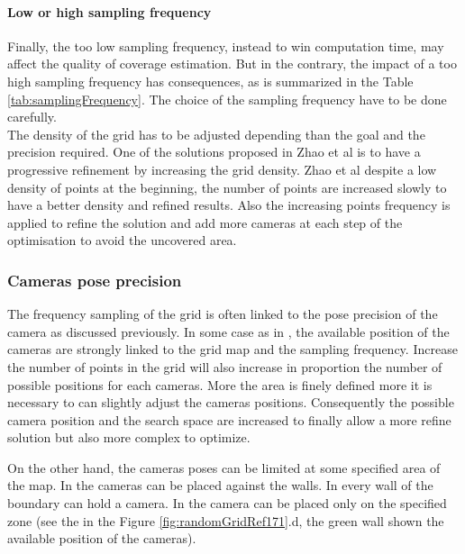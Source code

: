 \paragraph*{Low or high sampling frequency}
Finally, the too low sampling frequency, instead to win computation time, may affect the quality of coverage  estimation. But in the contrary, the impact of a too high sampling frequency has consequences, as is summarized in the Table \ref{tab:samplingFrequency}. The choice of the sampling frequency have to be done carefully. \\
The density of the grid has to be adjusted depending than the goal and the precision required. One of the solutions proposed in Zhao et al \citep{22*zhao2008} is to have a progressive refinement by increasing the grid density.
Zhao et al \citep{22*zhao2008} despite a low density of points at the beginning, the number of points are increased slowly to have a better density and refined results. Also the increasing points frequency is applied to refine the solution and add more cameras at each step of the optimisation to avoid the uncovered area.  \\


\subsubsection{Cameras pose precision}
The frequency sampling of the grid is often linked to the pose precision of the camera as discussed previously. In some case as in  \citep{83*van2009,150*chakrabarty2002,195*choi2009,87*morsly2012}, the available position of the cameras are strongly linked to the grid map and the sampling frequency.
Increase the number of points in the grid will also increase in proportion the number of possible positions for each cameras. More the area is finely defined more it is necessary to can slightly adjust the cameras positions. Consequently the possible camera position and the search space are increased to finally allow a more refine solution but also more complex to optimize.

On the other hand, the cameras poses can be limited at some specified area of the map. In \citep{171*horster2006,22*zhao2008} the cameras can be placed against the walls. In \cite{22*zhao2008} every wall  of the boundary can hold a camera. In \cite{171*horster2006} the camera can be placed only on the specified zone (see the   in the Figure \ref{fig:randomGridRef171}.d, the green wall shown the available position of the cameras).

